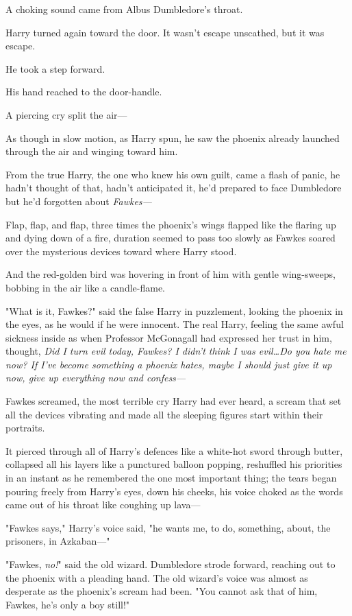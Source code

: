 A choking sound came from Albus Dumbledore's throat.

Harry turned again toward the door. It wasn't escape unscathed, but it was
escape.

He took a step forward.

His hand reached to the door-handle.

A piercing cry split the air---

As though in slow motion, as Harry spun, he saw the phoenix already launched
through the air and winging toward him.

From the true Harry, the one who knew his own guilt, came a flash of panic, he
hadn't thought of that, hadn't anticipated it, he'd prepared to face Dumbledore
but he'd forgotten about \emph{Fawkes---}

Flap, flap, and flap, three times the phoenix's wings flapped like the flaring
up and dying down of a fire, duration seemed to pass too slowly as Fawkes
soared over the mysterious devices toward where Harry stood.

And the red-golden bird was hovering in front of him with gentle wing-sweeps,
bobbing in the air like a candle-flame.

"What is it, Fawkes?" said the false Harry in puzzlement, looking the phoenix
in the eyes, as he would if he were innocent. The real Harry, feeling the same
awful sickness inside as when Professor McGonagall had expressed her trust in
him, thought, \emph{Did I turn evil today, Fawkes? I didn't think I was
evil…Do you hate me now? If I've become something a phoenix hates,
maybe I should just give it up now, give up everything now and confess---}

Fawkes screamed, the most terrible cry Harry had ever heard, a scream that set
all the devices vibrating and made all the sleeping figures start within their
portraits.

It pierced through all of Harry's defences like a white-hot sword through
butter, collapsed all his layers like a punctured balloon popping, reshuffled
his priorities in an instant as he remembered the one most important thing; the
tears began pouring freely from Harry's eyes, down his cheeks, his voice choked
as the words came out of his throat like coughing up lava---

"Fawkes says," Harry's voice said, "he wants me, to do, something, about, the
prisoners, in Azkaban---"

"Fawkes, \emph{no!}" said the old wizard. Dumbledore strode forward, reaching
out to the phoenix with a pleading hand. The old wizard's voice was almost as
desperate as the phoenix's scream had been. "You cannot ask that of him,
Fawkes, he's only a boy still!"

